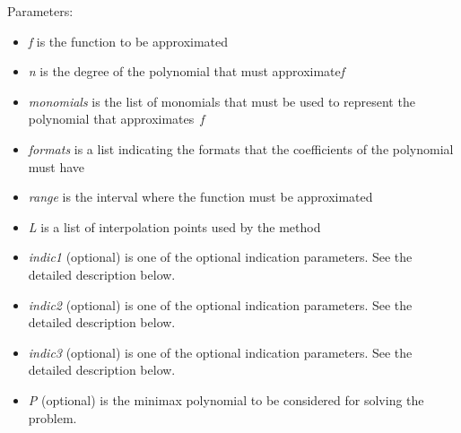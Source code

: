Parameters: 
\begin{itemize}
\item \emph{f} is the function to be approximated
\item \emph{n} is the degree of the polynomial that must approximate\emph{f}
\item \emph{monomials} is the list of monomials that must be used to represent the polynomial that approximates~\emph{f}
\item \emph{formats} is a list indicating the formats that the coefficients of the polynomial must have
\item \emph{range} is the interval where the function must be approximated
\item \emph{L} is a list of interpolation points used by the method
\item \emph{indic1} (optional) is one of the optional indication parameters. See the detailed description below.
\item \emph{indic2} (optional) is one of the optional indication parameters. See the detailed description below.
\item \emph{indic3} (optional) is one of the optional indication parameters. See the detailed description below.
\item \emph{P} (optional) is the minimax polynomial to be considered for solving the problem.
\end{itemize}
